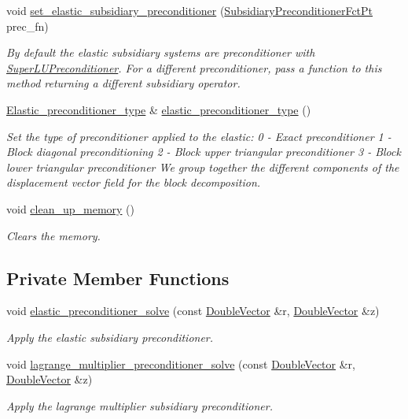\begin{DoxyCompactItemize}
void \hyperlink{classoomph_1_1PseudoElasticPreconditioner_a8c75fe5786d64a042056df16a062c055}{set\+\_\+elastic\+\_\+subsidiary\+\_\+preconditioner} (\hyperlink{classoomph_1_1PseudoElasticPreconditioner_a1462e1ef48ed2668c06dfd36c783d1a5}{Subsidiary\+Preconditioner\+Fct\+Pt} prec\+\_\+fn)
\begin{DoxyCompactList}\small\item\em By default the elastic subsidiary systems are preconditioner with \hyperlink{classoomph_1_1SuperLUPreconditioner}{Super\+L\+U\+Preconditioner}. For a different preconditioner, pass a function to this method returning a different subsidiary operator. \end{DoxyCompactList}\item 
\hyperlink{classoomph_1_1PseudoElasticPreconditioner_acde733e1a111a961d1e714add4e8015d}{Elastic\+\_\+preconditioner\+\_\+type} \& \hyperlink{classoomph_1_1PseudoElasticPreconditioner_a1bae7b43cffbfbce246b736d9e70f908}{elastic\+\_\+preconditioner\+\_\+type} ()
\begin{DoxyCompactList}\small\item\em Set the type of preconditioner applied to the elastic\+: 0 -\/ Exact preconditioner 1 -\/ Block diagonal preconditioning 2 -\/ Block upper triangular preconditioner 3 -\/ Block lower triangular preconditioner We group together the different components of the displacement vector field for the block decomposition. \end{DoxyCompactList}\item 
void \hyperlink{classoomph_1_1PseudoElasticPreconditioner_adcc9487ec16eea12912b2f3a023b4129}{clean\+\_\+up\+\_\+memory} ()
\begin{DoxyCompactList}\small\item\em Clears the memory. \end{DoxyCompactList}\end{DoxyCompactItemize}
\subsection*{Private Member Functions}
\begin{DoxyCompactItemize}
\item 
void \hyperlink{classoomph_1_1PseudoElasticPreconditioner_a9398dd60b00bc611a5b03e859256b410}{elastic\+\_\+preconditioner\+\_\+solve} (const \hyperlink{classoomph_1_1DoubleVector}{Double\+Vector} \&r, \hyperlink{classoomph_1_1DoubleVector}{Double\+Vector} \&z)
\begin{DoxyCompactList}\small\item\em Apply the elastic subsidiary preconditioner. \end{DoxyCompactList}\item 
void \hyperlink{classoomph_1_1PseudoElasticPreconditioner_a071ddbc46bb55f2c11fe0dfe9b69bb4a}{lagrange\+\_\+multiplier\+\_\+preconditioner\+\_\+solve} (const \hyperlink{classoomph_1_1DoubleVector}{Double\+Vector} \&r, \hyperlink{classoomph_1_1DoubleVector}{Double\+Vector} \&z)
\begin{DoxyCompactList}\small\item\em Apply the lagrange multiplier subsidiary preconditioner. \end{DoxyCompactList}\end{DoxyCompactItemize}
